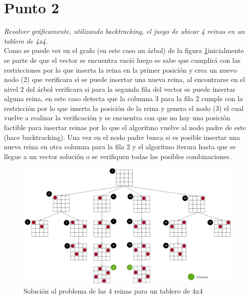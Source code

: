 \newpage
\section{Punto 2}

\textit{Resolver gráficamente, utilizando backtracking, el juego de ubicar 4 reinas en un tablero de 4x4.}\\


Como se puede ver en el grafo (en este caso un árbol) de la figura \ref{fig:4reinas}inicialmente se parte de que el vector se encuentra vació luego se sabe que cumplirá con las restricciones por lo que inserta la reina en la primer posición y crea un nuevo nodo (2) que verificara si se puede insertar una nueva reina, al encontrarse en el nivel 2 del árbol verificara si para la segunda fila del vector se puede insertar alguna reina, en este caso detecta que la columna 3 para la fila 2 cumple con la restricción por lo que inserta la posición de la reina y genera el nodo (3) el cual vuelve a realizar la verificación y se encuentra con que no hay una posición factible para insertar reinas por lo que el algoritmo vuelve al nodo padre de este (hace backtracking). Una vez en el nodo padre busca si es posible insertar una nueva reina en otra columna para la fila 2 y el algoritmo iterara hasta que se llegue a un vector solución o se verifiquen todas las posibles combinaciones.

\begin{figure}[!htb]
  \centering
  \includegraphics[width=\textwidth, scale=1]{Images/Punto2/4 reinas.png}
  \caption{Solución al problema de las 4 reinas para un tablero de 4x4}
  \label{fig:4reinas}
\end{figure}